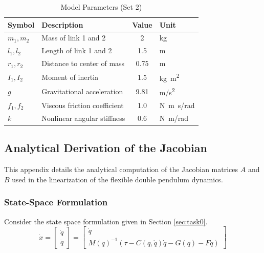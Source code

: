 \begin{table}[h]
    \centering
    \begin{tabular}{llcl}
        \toprule
        \textbf{Symbol} & \textbf{Description} & \textbf{Value} & \textbf{Unit} \\ \midrule
        $m_1, m_2$ & Mass of link 1 and 2 & 2 & \unit{kg} \\
        $l_1, l_2$ & Length of link 1 and 2 & 1.5 & \unit{m} \\
        $r_1, r_2$ & Distance to center of mass & 0.75 & \unit{m} \\
        $I_1, I_2$ & Moment of inertia & 1.5 & \unit{kg.m^2} \\
        $g$        & Gravitational acceleration & 9.81 & \unit{m/s^2} \\
        $f_1, f_2$ & Viscous friction coefficient & 1.0 & \unit{N.m.s/rad} \\
        $k$        & Nonlinear angular stiffness & 0.6 & \unit{N.m/rad} \\ \bottomrule
    \end{tabular}
    \caption{Model Parameters (Set 2)}
    \label{tab:model_parameters}
\end{table}


\subsection{Analytical Derivation of the Jacobian}
\label{app:analytic_jacobian_derivation}

This appendix details the analytical computation of the Jacobian matrices $A$ and $B$ used in the linearization of the flexible double pendulum dynamics.

\subsubsection{State-Space Formulation}
Consider the state space formulation given in Section \ref{sec:task0}.
\begin{equation}
    \dot{x} = 
    \begin{bmatrix}
        \dot{q} \\
        \ddot{q}
    \end{bmatrix} = 
    \begin{bmatrix}
        \dot{q} \\
        M(q)^{-1} \left( \tau - C(q, \dot{q})\dot{q} - G(q) - F\dot{q} \right)
    \end{bmatrix}
\end{equation}

